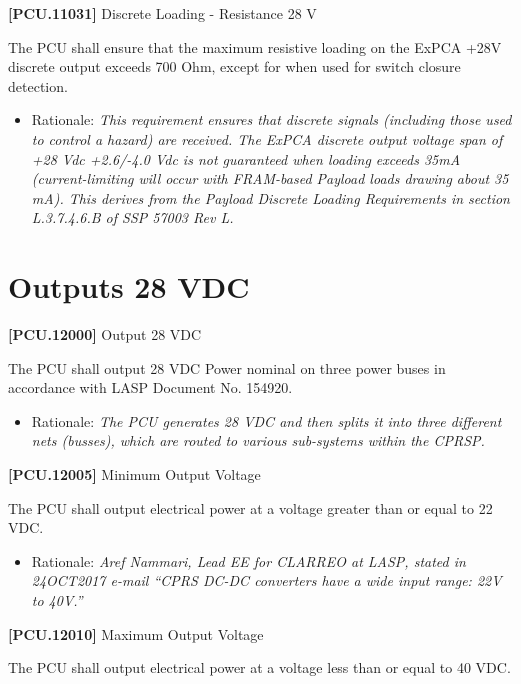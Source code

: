 \documentclass[12pt,oneside,oldfontcommands]{memoir}
\begin{document}
\textbf{[PCU.11031]} Discrete Loading - Resistance 28 V

The \gls{PCU} shall ensure that the maximum resistive loading on the ExPCA +28V discrete output exceeds 700 Ohm, except for when used for switch closure detection.

\begin{itemize}
\item{} Rationale: \emph{This requirement ensures that discrete signals (including those used to control a hazard) are received. The ExPCA discrete output voltage span of +28 Vdc +2.6\slash -4.0 Vdc is not guaranteed when loading exceeds 35mA (current-limiting will occur with FRAM-based Payload loads drawing about 35 mA). This derives from the Payload Discrete Loading Requirements in section L.3.7.4.6.B of SSP 57003 Rev L.}

\end{itemize}

\section{Outputs 28 VDC}
\label{outputs28vdc}

\textbf{[PCU.12000]} Output 28 \gls{VDC}

The \gls{PCU} shall output 28 \gls{VDC} Power nominal on three power buses in accordance with \gls{LASP} Document No. 154920.

\begin{itemize}
\item{} Rationale: \emph{The PCU generates 28 VDC and then splits it into three different nets (busses), which are routed to various sub-systems within the CPRSP.}

\end{itemize}

\textbf{[PCU.12005]} Minimum Output Voltage

The \gls{PCU} shall output electrical power at a voltage greater than or equal to 22 \gls{VDC}.

\begin{itemize}
\item{} Rationale: \emph{Aref Nammari, Lead EE for CLARREO at LASP, stated in 24OCT2017 e-mail ``CPRS DC-DC converters have a wide input range: 22V to 40V.''}

\end{itemize}

\textbf{[PCU.12010]} Maximum Output Voltage

The \gls{PCU} shall output electrical power at a voltage less than or equal to 40 \gls{VDC}.
\end{document}
